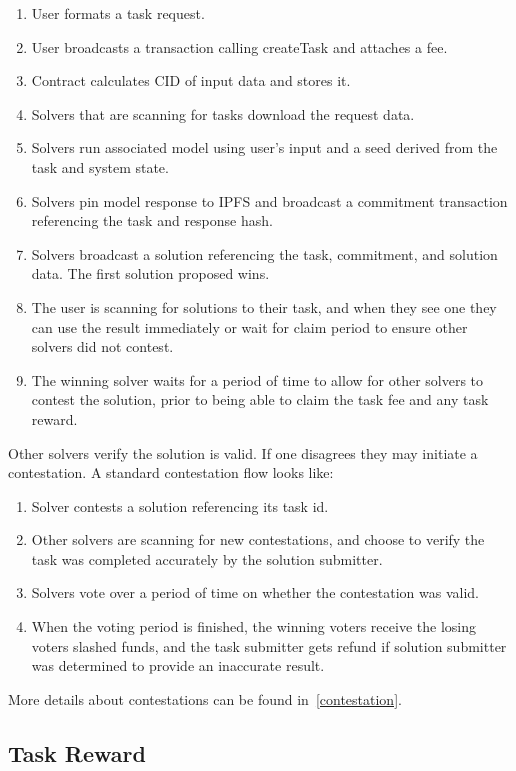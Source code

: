 \documentclass{article}
\begin{document}
\begin{enumerate}
    \item User formats a task request.
    \item User broadcasts a transaction calling createTask and attaches a fee.
    \item Contract calculates CID of input data and stores it.
    \item Solvers that are scanning for tasks download the request data.
    \item Solvers run associated model using user's input and a seed derived from the task and system state.
    \item Solvers pin model response to IPFS and broadcast a commitment transaction referencing the task and response hash.
    \item Solvers broadcast a solution referencing the task, commitment, and solution data. The first solution proposed wins.
    \item The user is scanning for solutions to their task, and when they see one they can use the result immediately or wait for claim period to ensure other solvers did not contest.
    \item The winning solver waits for a period of time to allow for other solvers to contest the solution, prior to being able to claim the task fee and any task reward.
\end{enumerate}

Other solvers verify the solution is valid. If one disagrees they may initiate a contestation. A standard contestation flow looks like:

\begin{enumerate}
    \item Solver contests a solution referencing its task id.
    \item Other solvers are scanning for new contestations, and choose to verify the task was completed accurately by the solution submitter.
    \item Solvers vote over a period of time on whether the contestation was valid.
    \item When the voting period is finished, the winning voters receive the losing voters slashed funds, and the task submitter gets refund if solution submitter was determined to provide an inaccurate result.
\end{enumerate}

More details about contestations can be found in~\ref{contestation}.

\subsection{Task Reward}\label{taskreward}
\end{document}
